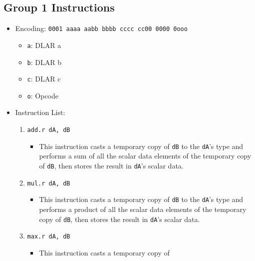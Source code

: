 \documentclass{article}
\begin{document}
	\subsection{Group 1 Instructions}
		\begin{itemize}
		\item Encoding: \texttt{0001 aaaa aabb bbbb  cccc cc00 0000 0ooo}
			\begin{itemize}
			\item \texttt{a}: DLAR a
			\item \texttt{b}: DLAR b
			\item \texttt{c}: DLAR c
			\item \texttt{o}: Opcode
			\end{itemize}
		\item Instruction List:
			\begin{enumerate}
			\item \texttt{add.r dA, dB}
				\begin{itemize}
				\item This instruction casts a temporary copy of
					\texttt{dB} to the \texttt{dA}'s type and performs a
					sum of all the scalar data elements of the temporary
					copy of \texttt{dB}, then stores the result in
					\texttt{dA}'s scalar data.
				\end{itemize}
			\item \texttt{mul.r dA, dB}
				\begin{itemize}
				\item This instruction casts a temporary copy of
					\texttt{dB} to the \texttt{dA}'s type and performs a
					product of all the scalar data elements of the
					temporary copy of \texttt{dB}, then stores the result
					in \texttt{dA}'s scalar data.
				\end{itemize}
			\item \texttt{max.r dA, dB}
				\begin{itemize}
				\item This instruction casts a temporary copy of

\end{itemize}
\end{enumerate}
\end{itemize}
\end{document}
